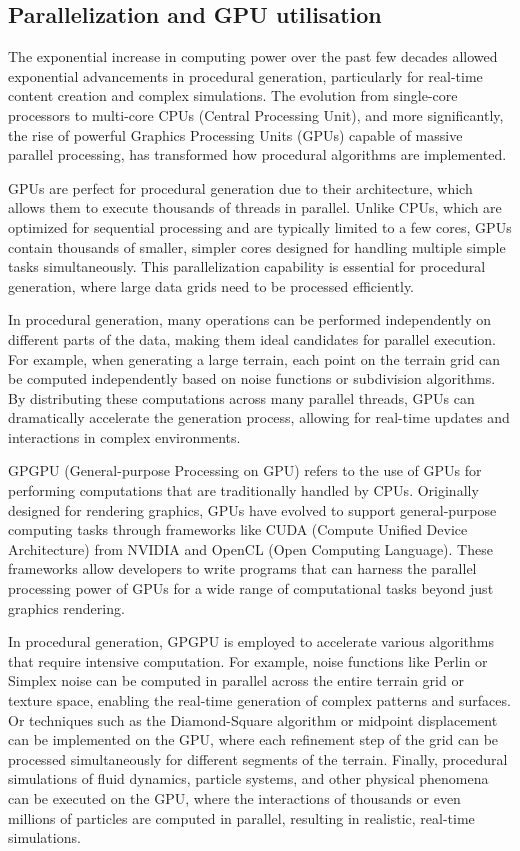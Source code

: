 \subsection{Parallelization and GPU utilisation}

The exponential increase in computing power over the past few decades allowed exponential advancements in procedural generation, particularly for real-time content creation and complex simulations. The evolution from single-core processors to multi-core CPUs (Central Processing Unit), and more significantly, the rise of powerful Graphics Processing Units (GPUs) capable of massive parallel processing, has transformed how procedural algorithms are implemented.

GPUs are perfect for procedural generation due to their architecture, which allows them to execute thousands of threads in parallel. Unlike CPUs, which are optimized for sequential processing and are typically limited to a few cores, GPUs contain thousands of smaller, simpler cores designed for handling multiple simple tasks simultaneously. This parallelization capability is essential for procedural generation, where large data grids need to be processed efficiently.

In procedural generation, many operations can be performed independently on different parts of the data, making them ideal candidates for parallel execution. For example, when generating a large terrain, each point on the terrain grid can be computed independently based on noise functions or subdivision algorithms. By distributing these computations across many parallel threads, GPUs can dramatically accelerate the generation process, allowing for real-time updates and interactions in complex environments.

GPGPU (General-purpose Processing on GPU) refers to the use of GPUs for performing computations that are traditionally handled by CPUs. Originally designed for rendering graphics, GPUs have evolved to support general-purpose computing tasks through frameworks like CUDA (Compute Unified Device Architecture) from NVIDIA and OpenCL (Open Computing Language). These frameworks allow developers to write programs that can harness the parallel processing power of GPUs for a wide range of computational tasks beyond just graphics rendering.

In procedural generation, GPGPU is employed to accelerate various algorithms that require intensive computation. For example, noise functions like Perlin or Simplex noise can be computed in parallel across the entire terrain grid or texture space, enabling the real-time generation of complex patterns and surfaces. Or techniques such as the Diamond-Square algorithm or midpoint displacement can be implemented on the GPU, where each refinement step of the grid can be processed simultaneously for different segments of the terrain. Finally, procedural simulations of fluid dynamics, particle systems, and other physical phenomena can be executed on the GPU, where the interactions of thousands or even millions of particles are computed in parallel, resulting in realistic, real-time simulations.

